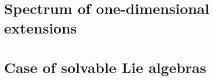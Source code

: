 \documentclass[letterpaper]{amsart}
\begin{document}
\section{Spectrum of one-dimensional extensions}%
\label{sec:1extensions}


\section{Case of solvable Lie algebras}%
\label{sec:solvable}


%


%
\printbibliography
\end{document}
